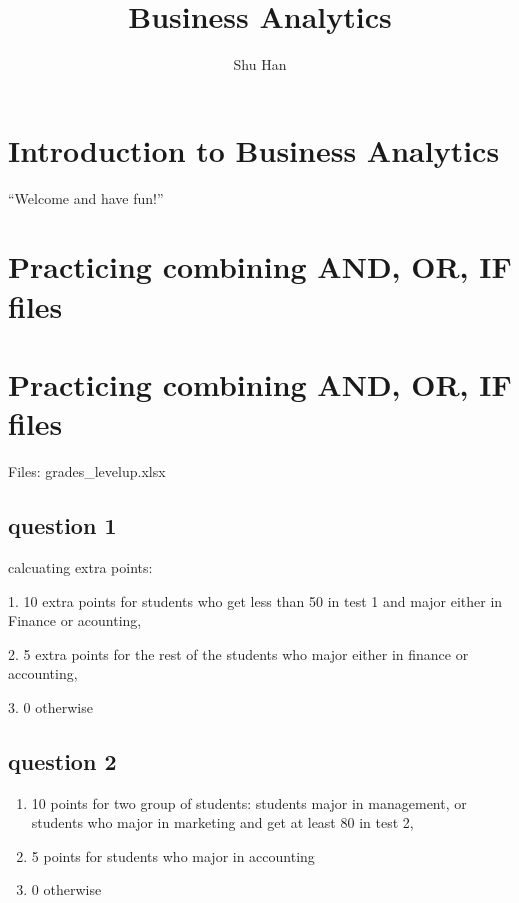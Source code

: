 \documentclass[
  letterpaper,
]{scrbook}
\title{Business Analytics}
\author{Shu Han}
\date{}
\providecommand{\tightlist}{%
  \setlength{\itemsep}{0pt}\setlength{\parskip}{0pt}}
\renewcommand*\contentsname{Table of contents}
\newcommand\contentsname{Table of contents}
\begin{document}
\frontmatter
\maketitle

\renewcommand*\contentsname{Table of contents}
{
\setcounter{tocdepth}{2}
\tableofcontents
}

\mainmatter
{}

\chapter{Introduction to Business
Analytics}\label{introduction-to-business-analytics}

``Welcome and have fun!''


\chapter{Practicing combining AND, OR, IF
files}\label{practicing-combining-and-or-if-files}


\chapter{Practicing combining AND, OR, IF
files}\label{practicing-combining-and-or-if-files-1}

Files: grades\_levelup.xlsx

\section{question 1}\label{question-1}

calcuating extra points:

1. 10 extra points for students who get less than 50 in test 1 and major
either in Finance or acounting,

2. 5 extra points for the rest of the students who major either in
finance or accounting,

3. 0 otherwise

\section{question 2}\label{question-2}

\begin{enumerate}
\def\labelenumi{\arabic{enumi}.}
\tightlist
\item
  10 points for two group of students: students major in management, or
  students who major in marketing and get at least 80 in test 2,
\item
  5 points for students who major in accounting
\item
  0 otherwise
\end{enumerate}
\end{document}
